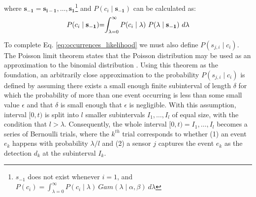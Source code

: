 \noindent where $\mathbf{s_{-1}} = \mathbf{s_{i-1}}, \ldots, \mathbf{s_1}$\footnote{$s_{-1}$ does not exist whenever $i = 1$, and \\ $P(c_i) = \int_{\lambda=0}^{\infty} P(c_i \mid \lambda) ~ Gam(\lambda \mid \alpha, \beta) ~d\lambda$} and \hspace{0.3cm}$P(c_i \mid \mathbf{s_{-1}})$ can be calculated as:
\begin{equation}
	\label{eq:unconditional_xi}
	\begin{tabular}{r@{=}l}
		$P(c_i \mid \mathbf{s_{-1}})$ & $\displaystyle\int_{\lambda=0}^{\infty} P(c_i \mid \lambda) ~ P(\lambda \mid \mathbf{s_{-1}}) ~d\lambda$ \\ [2ex]
	\end{tabular}
\end{equation}
To complete Eq. \ref{eq:occurrences_likelihood} we must also define $P(s_{j,i} \mid c_i)$. The Poisson limit theorem states that the Poisson distribution may be used as an approximation to the binomial distribution \cite{papoulis2002probability}. Using this theorem as the foundation, an arbitrarily close approximation to the probability $P(s_{j,i} \mid c_i)$ is defined by assuming there exists a small enough finite subinterval of length $\delta$ for which the probability of more than one event occurring is less than some small value $ \epsilon$ and that $\delta$ is small enough that $\epsilon$ is negligible. With this assumption, interval $[0, t)$ is split into $l$ smaller subintervals $I_1, \ldots, I_l$ of equal size, with the condition that $l > \lambda$. Consequently, the whole interval $[0, t) = I_1, \ldots, I_l$ becomes a series of Bernoulli trials, where the $k^{th}$ trial corresponds to whether (1) an event $e_k$ happens with probability $\lambda / l$ and (2) a sensor $j$ captures the event $e_k$ as the detection $d_k$ at the subinterval $I_k$.

